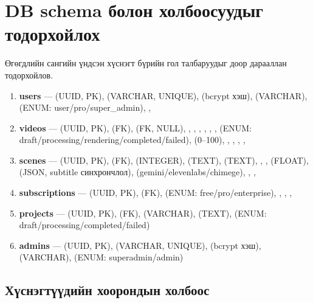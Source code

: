 \section{DB schema болон холбоосуудыг тодорхойлох}

Өгөгдлийн сангийн үндсэн хүснэгт бүрийн гол талбаруудыг доор дарааллан тодорхойлов.

\begin{enumerate}
\item \textbf{users} ---  (UUID, PK),  (VARCHAR, UNIQUE),  (bcrypt хэш),  (VARCHAR),  (ENUM: user/pro/super\_admin), , 
\item \textbf{videos} ---  (UUID, PK),  (FK),  (FK, NULL), , , , , , ,  (ENUM: draft/processing/rendering/completed/failed),  (0--100), , , , , 
\item \textbf{scenes} ---  (UUID, PK),  (FK),  (INTEGER),  (TEXT),  (TEXT), , ,  (FLOAT),  (JSON, subtitle синхрончлол),  (gemini/elevenlabs/chimege), , , 
\item \textbf{subscriptions} ---  (UUID, PK),  (FK),  (ENUM: free/pro/enterprise), , , , 
\item \textbf{projects} ---  (UUID, PK),  (FK),  (VARCHAR),  (TEXT),  (ENUM: draft/processing/completed/failed)
\item \textbf{admins} ---  (UUID, PK),  (VARCHAR, UNIQUE),  (bcrypt хэш),  (VARCHAR),  (ENUM: superadmin/admin)
\end{enumerate}

\subsection{Хүснэгтүүдийн хоорондын холбоос}


